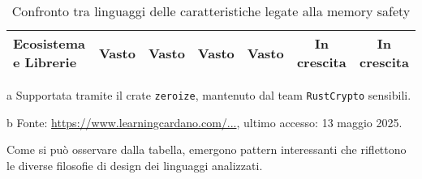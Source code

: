 \begin{table}[H]
\begin{threeparttable}
\begin{tabular}{l|c|c|c|c|c|c|}
      \textbf{Ecosistema e Librerie} & \cellcolor{green!20}Vasto     & \cellcolor{green!20}Vasto     & \cellcolor{green!20}Vasto     & \cellcolor{green!20}Vasto     & \cellcolor{yellow!20}In crescita & \cellcolor{yellow!20}In crescita \\
      \hline
    \end{tabular}
    \begin{tablenotes}
      \footnotesize \item[a] Supportata tramite il crate \texttt{zeroize}, mantenuto
      dal team \texttt{RustCrypto} sensibili. \item[b] Fonte:
      \url{https://www.learningcardano.com/...}, ultimo accesso: 13 maggio 2025.
    \end{tablenotes}
  \end{threeparttable}
  \caption{Confronto tra linguaggi delle caratteristiche legate alla memory
  safety}
  \label{tab:linguaggi_memory_safety}
\end{table}



\noindent

Come si può osservare dalla tabella, emergono pattern interessanti che riflettono
le diverse filosofie di design dei linguaggi analizzati.

